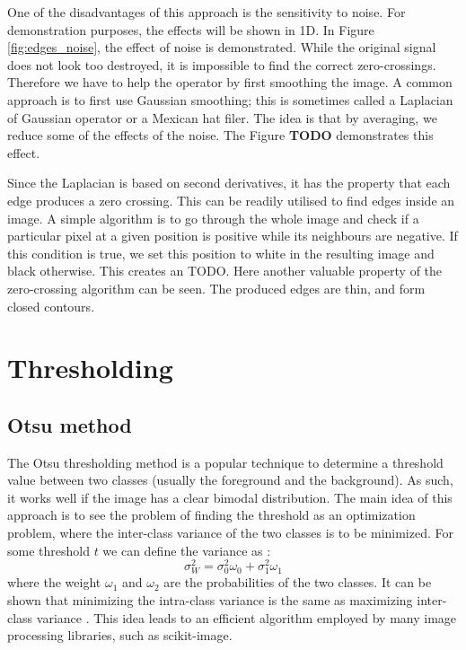 \documentclass[
  digital,     %
  oneside,     %
  nosansbold,  %
  nocolorbold, %
  lof,         %
  lot,         %
]{fithesis4}
\begin{document}
One of the disadvantages of this approach is the sensitivity to noise. For
demonstration purposes, the effects will be shown in 1D. In Figure
\ref{fig:edges_noise}, the effect of noise is demonstrated. While the original
signal does not look too destroyed, it is impossible to find the correct
zero-crossings. Therefore we have to help the operator by first smoothing the
image. A common approach is to first use Gaussian smoothing; this is sometimes
called a Laplacian of Gaussian operator or a Mexican hat filer. The idea is that
by averaging, we reduce some of the effects of the noise. The Figure \textbf{TODO}
demonstrates this effect.

Since the Laplacian is based on second derivatives, it has the property that
each edge produces a zero crossing. This can be readily utilised to find edges
inside an image. A simple algorithm is to go through the whole image and check
if a particular pixel at a given position is positive while its neighbours are
negative. If this condition is true, we set this position to white in the
resulting image and black otherwise. This creates an TODO. Here another valuable
property of the zero-crossing algorithm can be seen. The produced edges are
thin, and form closed contours.

\section{Thresholding}

\subsection{Otsu method}

The Otsu thresholding method is a popular technique to determine a threshold
value between two classes (usually the foreground and the background). As such,
it works well if the image has a clear bimodal distribution. The main idea of
this approach is to see the problem of finding the threshold as an optimization
problem, where the inter-class variance of the two classes is to be minimized.
For some threshold $t$ we can define the variance as \parencite{otsu1979}:
$$\sigma^2_W = \sigma^2_0 \omega_0 + \sigma^2_1 \omega_1$$  %
where the weight $\omega_1$ and $\omega_2$ are the probabilities of the two
classes. It can be shown that minimizing the intra-class variance is the same as
maximizing inter-class variance \parencite{otsu1979}. This idea leads to an
efficient algorithm employed by many image processing libraries, such as
scikit-image.
\end{document}
